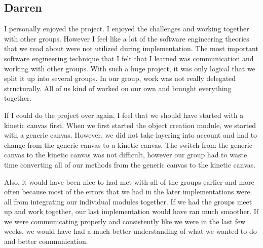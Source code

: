 \documentclass[a4paper, 11pt]{article} %
\begin{document}
\subsection{Darren}
I personally enjoyed the project. I enjoyed the challenges and working together with other groups. However I feel like a lot of the software engineering theories that we read about were not utilized during implementation. The most important software engineering technique that I felt that I learned was communication and working with other groups. With such a huge project, it was only logical that we split it up into several groups. In our group, work was not really delegated structurally. All of us kind of worked on our own and brought everything together. 

If I could do the project over again, I feel that we should have started with a kinetic canvas first. When we first started the object creation module, we started with a generic canvas. However, we did not take layering into account and had to change from the generic canvas to a kinetic canvas. The switch from the generic canvas to the kinetic canvas was not difficult, however our group had to waste time converting all of our methods from the generic canvas to the kinetic canvas.  

Also, it would have been nice to had met with all of the groups earlier and more often because most of the errors that we had in the later implementations were all from integrating our individual modules together. If we had the groups meet up and work together, our last implementation would have ran much smoother. If we were communicating properly and consistently like we were in the last few weeks, we would have had a much better understanding of what we wanted to do and better communication. 









\end{document}

